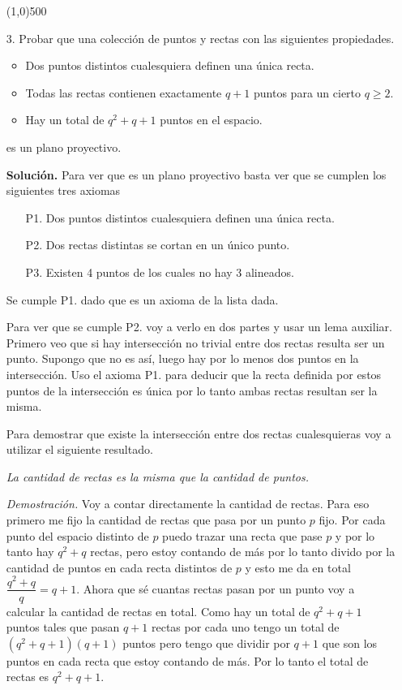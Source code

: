 \documentclass{article}
\begin{document}
\begin{itemize}
    \line(1,0){500}

   \item[3.] Probar que una colección de puntos y rectas con las siguientes propiedades.
   \begin{itemize}
   	\item Dos puntos distintos cualesquiera definen una única recta.
   	\item Todas las rectas contienen exactamente $q+1$ puntos para un cierto $q \ge 2$.
   	\item Hay un total de $q^2+q+1$ puntos en el espacio.
   	
   \end{itemize}
              es un plano proyectivo. 
             
   \textbf{Solución.}
   Para ver que es un plano proyectivo basta ver que se cumplen los siguientes tres axiomas
  	\begin{itemize}
  		\item[P1.] Dos puntos distintos cualesquiera definen una única recta.
  		\item[P2.] Dos rectas distintas se cortan en un único punto.
  		\item[P3.] Existen 4 puntos de los cuales no hay 3 alineados.
	\end{itemize}
	
	Se cumple P1. dado que es un axioma de la lista dada.
	
	Para ver que se cumple P2. voy a verlo en dos partes y usar un lema auxiliar. Primero veo que si hay intersección no trivial entre dos rectas resulta ser un punto. Supongo que no es así, luego hay por lo menos dos puntos en la intersección. Uso el axioma P1. para deducir que la recta definida por estos puntos de la intersección es única por lo tanto ambas rectas resultan ser la misma.
	
	Para demostrar que existe la intersección entre dos rectas cualesquieras voy a utilizar el siguiente resultado.
	\medskip
	\begin{tcolorbox}[title=Lema auxiliar]
		\textit{La cantidad de rectas es la misma que la cantidad de puntos.}
	\end{tcolorbox}

{\small 	\textit{Demostración.} Voy a contar directamente la cantidad de rectas. Para eso primero me fijo la cantidad de rectas que pasa por un punto $p$ fijo. Por cada punto del espacio distinto de $p$ puedo trazar una recta que pase $p$ y por lo tanto hay $q^2 + q$ rectas, pero estoy contando de más por lo tanto divido por la cantidad de puntos en cada recta distintos de $p$ y esto me da en total $\dfrac{q^2 +q}{q} = q+1$. Ahora que sé cuantas rectas pasan por un punto voy a calcular la cantidad de rectas en total. Como hay un total de $q^2 +q+1$ puntos tales que pasan $q+1$ rectas por cada uno tengo un total de $(q^2 +q+1)(q+1)$ puntos pero tengo que dividir por $q+1$ que son los puntos en cada recta que estoy contando de más. Por lo tanto el total de rectas es $q^2 +q+1$.}
	

\end{itemize}
\end{document}
